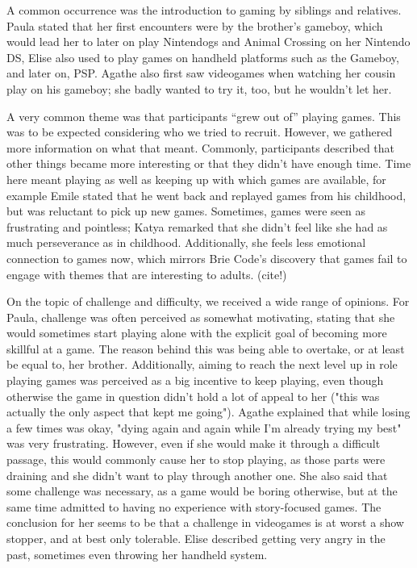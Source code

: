 \documentclass[]{vutinfth}
\begin{document}
A common occurrence was the introduction to gaming by siblings and
relatives. Paula stated that her first encounters were by the brother's
gameboy, which would lead her to later on play Nintendogs and Animal
Crossing on her Nintendo DS, Elise also used to play games on handheld
platforms such as the Gameboy, and later on, PSP. Agathe also first saw
videogames when watching her cousin play on his gameboy; she badly
wanted to try it, too, but he wouldn't let her.

A very common theme was that participants ``grew out of'' playing games.
This was to be expected considering who we tried to recruit. However, we
gathered more information on what that meant. Commonly, participants
described that other things became more interesting or that they didn't
have enough time. Time here meant playing as well as keeping up with
which games are available, for example Emile stated that he went back
and replayed games from his childhood, but was reluctant to pick up new
games. Sometimes, games were seen as frustrating and pointless; Katya
remarked that she didn't feel like she had as much perseverance as in
childhood. Additionally, she feels less emotional connection to games
now, which mirrors Brie Code's discovery that games fail to engage with
themes that are interesting to adults. (cite!)

On the topic of challenge and difficulty, we received a wide range of
opinions. For Paula, challenge was often perceived as somewhat
motivating, stating that she would sometimes start playing alone with
the explicit goal of becoming more skillful at a game. The reason behind
this was being able to overtake, or at least be equal to, her brother.
Additionally, aiming to reach the next level up in role playing games
was perceived as a big incentive to keep playing, even though otherwise
the game in question didn't hold a lot of appeal to her ("this was
actually the only aspect that kept me going"). Agathe explained that
while losing a few times was okay, "dying again and again while I'm
already trying my best" was very frustrating. However, even if she would
make it through a difficult passage, this would commonly cause her to
stop playing, as those parts were draining and she didn't want to play
through another one. She also said that some challenge was necessary, as
a game would be boring otherwise, but at the same time admitted to
having no experience with story-focused games. The conclusion for her
seems to be that a challenge in videogames is at worst a show stopper,
and at best only tolerable. Elise described getting very angry in the
past, sometimes even throwing her handheld system.
\end{document}
